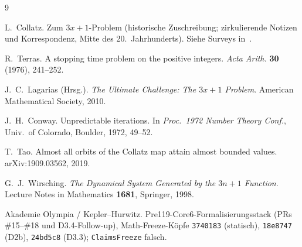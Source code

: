 \documentclass[11pt,a4paper]{article}
\theoremstyle{definition}
\theoremstyle{remark}
\begin{document}
\begin{thebibliography}{9}

L.~Collatz.
\newblock Zum $3x+1$-Problem (historische Zuschreibung; zirkulierende Notizen
und Korrespondenz, Mitte des 20.~Jahrhunderts).
\newblock Siehe Surveys in~\cite{Lagarias2010}.

R.~Terras.
\newblock A stopping time problem on the positive integers.
\newblock \emph{Acta Arith.} \textbf{30} (1976), 241--252.

J.~C.~Lagarias (Hrsg.).
\newblock \emph{The Ultimate Challenge: The $3x+1$ Problem}.
\newblock American Mathematical Society, 2010.

J.~H.~Conway.
\newblock Unpredictable iterations.
\newblock In \emph{Proc.\ 1972 Number Theory Conf.}, Univ.\ of Colorado,
Boulder, 1972, 49--52.

T.~Tao.
\newblock Almost all orbits of the Collatz map attain almost bounded values.
\newblock arXiv:1909.03562, 2019.

G.~J.~Wirsching.
\newblock \emph{The Dynamical System Generated by the $3n+1$ Function}.
\newblock Lecture Notes in Mathematics \textbf{1681}, Springer, 1998.

Akademie Olympia / Kepler--Hurwitz.
\newblock Pre119-Core6-Formalisierungsstack (PRs \#15--\#18 und D3.4-Follow-up),
Math-Freeze-Köpfe
\texttt{3740183} (statisch),
\texttt{18e8747} (D2b),
\texttt{24bd5c8} (D3.3);
\texttt{ClaimsFreeze} falsch.

\end{thebibliography}
\end{document}
